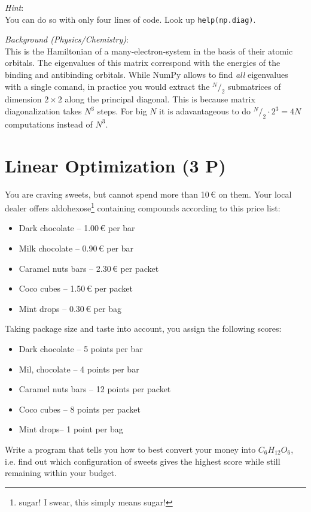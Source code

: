 \documentclass[
	english,
	fontsize=10pt,
	parskip=half,
	titlepage=true,
	DIV=12
]{scrartcl}
\newcommand*{\ie}{i.\;e. }
\begin{document}
\emph{Hint}:\\
You can do so with only four lines of code. Look up \texttt{help(np.diag)}.

\emph{Background (Physics/Chemistry)}:\\
This is the Hamiltonian of a many-electron-system in the basis of their atomic orbitals. The eigenvalues of this matrix correspond with the energies of the binding and antibinding orbitals. While NumPy allows to find \emph{all} eigenvalues with a single comand, in practice you would extract the $^{N}/_{2}$ submatrices of dimension $2 \times 2$ along the principal diagonal. This is because matrix diagonalization takes $N^3$ steps. For big $N$ it is adavantageous to do $^{N}/_{2} \cdot 2^3 = 4N$ computations instead of $N^3$.

\section{Linear Optimization (3 P)}
You are craving sweets, but cannot spend more than 10\,€ on them. Your local dealer offers aldohexose\footnote{sugar! I swear, this simply means sugar!} containing compounds according to this price list:
\begin{itemize}
\item Dark chocolate -- 1.00\,€ per bar
\item Milk chocolate -- 0.90\,€ per bar
\item Caramel nuts bars -- 2.30\,€ per packet
\item Coco cubes -- 1.50\,€ per packet
\item Mint drops -- 0.30\,€ per bag
\end{itemize}

Taking package size and taste into account, you assign the following scores:
\begin{itemize}
\item Dark chocolate -- 5 points per bar
\item Mil, chocolate -- 4 points per bar
\item Caramel nuts bars -- 12 points per packet
\item Coco cubes -- 8 points per packet
\item Mint drops-- 1 point per bag
\end{itemize}

Write a program that tells you how to best convert  your money into $C_6H_{12}O_6$, \ie find out which configuration of sweets gives the highest score while still remaining within your budget.
\end{document}
